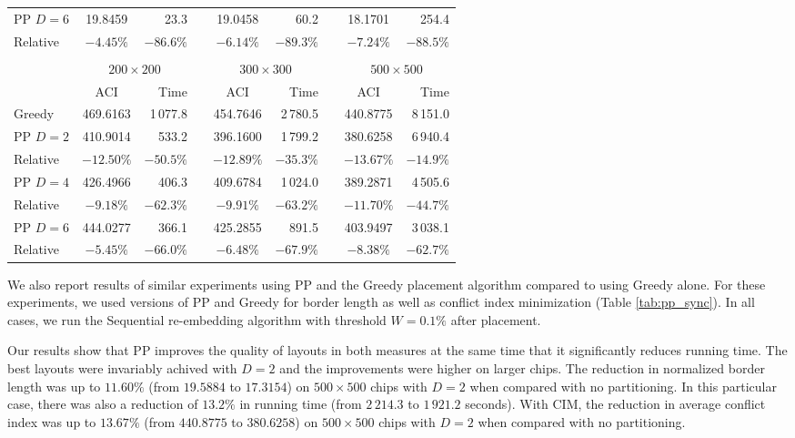 \begin{table}[t!]
{\begin{tabular}{lcrlcrlcr}
\hline
PP $D=6$ &  19.8459 &  23.3   & &  19.0458 &  60.2   & &  18.1701 &    254.4   \\
Relative & $-4.45\%$&$-86.6\%$& & $-6.14\%$&$-89.3\%$& & $-7.24\%$&   $-88.5\%$\\
\hline
\\
\vspace{1pt}
 & \multicolumn{2}{c}{$200\times 200$} & & \multicolumn{2}{c}{$300\times 300$} & & \multicolumn{2}{c}{$500\times 500$} \\
\cline{2-3} \cline{5-6} \cline{8-9}
\vspace{1pt}
         & ACI      & Time       & & ACI      & Time       & & ACI      & Time       \\
\hline
Greedy   & 469.6163 & 1\,077.8   & & 454.7646 & 2\,780.5   & & 440.8775 & 8\,151.0   \\
\hline
PP $D=2$ & 410.9014 &    533.2   & & 396.1600 & 1\,799.2   & & 380.6258 & 6\,940.4   \\
Relative &$-12.50\%$&   $-50.5\%$& &$-12.89\%$&   $-35.3\%$& &$-13.67\%$&   $-14.9\%$\\
\hline
PP $D=4$ & 426.4966 &    406.3   & & 409.6784 & 1\,024.0   & & 389.2871 & 4\,505.6   \\
Relative & $-9.18\%$&   $-62.3\%$& & $-9.91\%$&   $-63.2\%$& &$-11.70\%$&   $-44.7\%$\\
\hline
PP $D=6$ & 444.0277 &    366.1   & & 425.2855 &    891.5   & & 403.9497 & 3\,038.1   \\
Relative & $-5.45\%$&   $-66.0\%$& & $-6.48\%$&   $-67.9\%$& & $-8.38\%$&   $-62.7\%$\\
\hline
\end{tabular}}
\end{table}

We also report results of similar experiments using PP and the Greedy placement
algorithm compared to using Greedy alone. For these experiments, we used
versions of PP and Greedy for border length as well as conflict index
minimization (Table \ref{tab:pp_sync}). In all cases, we run the Sequential
re-embedding algorithm with threshold $W=0.1\%$ after placement.

Our results show that PP improves the quality of layouts in both measures at the
same time that it significantly reduces running time. The best layouts were
invariably achived with $D=2$ and the improvements were higher on larger chips.
The reduction in normalized border length was up to $11.60\%$ (from $19.5884$ to
$17.3154$) on $500\times 500$ chips with $D=2$ when compared with no
partitioning. In this particular case, there was also a reduction of $13.2\%$ in
running time (from $2\,214.3$ to $1\,921.2$ seconds). With CIM, the reduction in
average conflict index was up to $13.67\%$ (from $440.8775$ to $380.6258$) on
$500\times 500$ chips with $D=2$ when compared with no partitioning.

